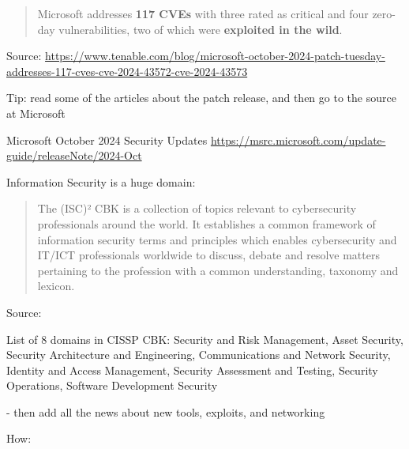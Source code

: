 \documentclass[Screen16to9,17pt]{foils}
\begin{document}
\slide{}


\begin{quote}
Microsoft addresses {\bf 117 CVEs} with three rated as critical and four zero-day vulnerabilities, two of which were {\bf exploited in the wild}.
\end{quote}
Source: \url{https://www.tenable.com/blog/microsoft-october-2024-patch-tuesday-addresses-117-cves-cve-2024-43572-cve-2024-43573}


\begin{list2}
\item Tip: read some of the articles about the patch release, and then go to the source at Microsoft
\item Microsoft October 2024 Security Updates \url{https://msrc.microsoft.com/update-guide/releaseNote/2024-Oct}
\end{list2}





Information Security is a huge domain:

\begin{quote}
The (ISC)² CBK is a collection of topics relevant to cybersecurity professionals around the world. It establishes a common framework of information security terms and principles which enables cybersecurity and IT/ICT professionals worldwide to discuss, debate and resolve matters pertaining to the profession with a common understanding, taxonomy and lexicon.
\end{quote}
Source: 

List of 8 domains in CISSP CBK: Security and Risk Management, Asset Security,
Security Architecture and Engineering, Communications and Network Security, Identity and Access Management, Security Assessment and Testing, Security Operations, Software Development Security

- then add all the news about new tools, exploits, and networking







How:
\end{document}

